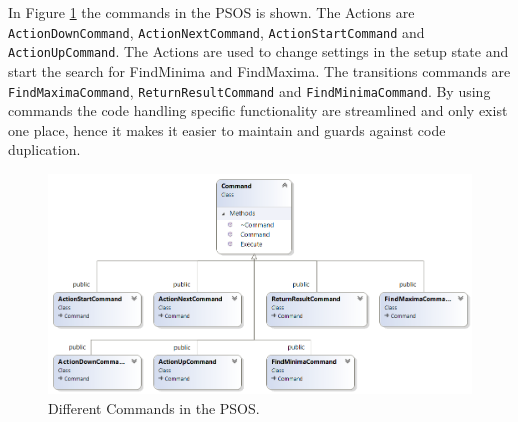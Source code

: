 In Figure \ref{fig:commands} the commands in the PSOS is shown. The Actions are \texttt{ActionDownCommand}, \texttt{ActionNextCommand}, \texttt{ActionStartCommand} and \texttt{ActionUpCommand}. The Actions are used to change settings in the setup state and start the search for FindMinima and FindMaxima. The transitions commands are \texttt{FindMaximaCommand}, \texttt{ReturnResultCommand} and \texttt{FindMinimaCommand}. By using commands the code handling specific functionality are streamlined and only exist one place, hence it makes it easier to maintain and guards against code duplication.
\begin{figure}[H]
	\centering
	\includegraphics[width=1\linewidth]{diagram/Commands}
	\caption[The commands used to control actions and transitions]{Different Commands in the PSOS. }
	\label{fig:commands}
\end{figure}